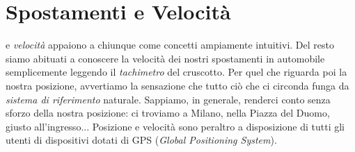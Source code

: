 \section{Spostamenti e Velocit\`a}

  e {\em velocit\`a} 
appaiono a chiunque come concetti ampiamente
intuitivi. Del resto siamo abituati a conoscere la velocit\`a
dei nostri spostamenti in automobile semplicemente
leggendo il {\em tachimetro}  del cruscotto.
Per quel che riguarda poi la nostra posizione, avvertiamo la sensazione 
che tutto ci\`o che ci circonda funga da {\em sistema di riferimento}
naturale. Sappiamo, in generale, renderci conto senza sforzo della nostra
posizione: ci troviamo a Milano, nella Piazza del Duomo, giusto all'ingresso...
Posizione e velocit\`a sono peraltro a disposizione di tutti gli
utenti di dispositivi dotati di GPS ({\em Global Positioning System}). 

